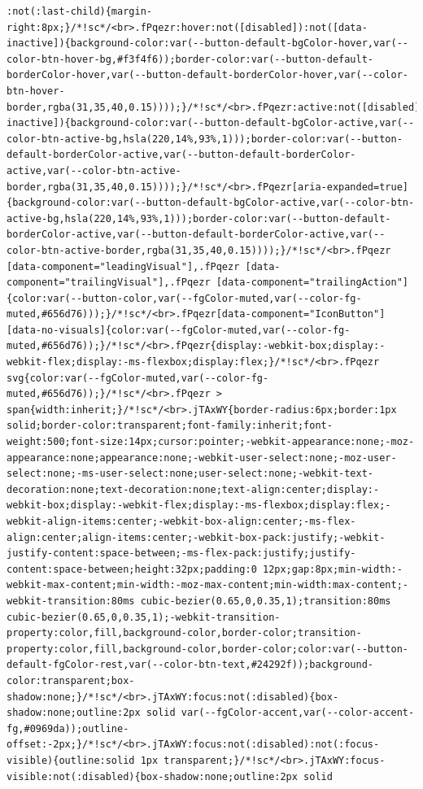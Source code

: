 \documentclass[
  letterpaper,
]{book}
\begin{document}
\begin{verbatim}
:not(:last-child){margin-right:8px;}/*!sc*/<br>.fPqezr:hover:not([disabled]):not([data-inactive]){background-color:var(--button-default-bgColor-hover,var(--color-btn-hover-bg,#f3f4f6));border-color:var(--button-default-borderColor-hover,var(--button-default-borderColor-hover,var(--color-btn-hover-border,rgba(31,35,40,0.15))));}/*!sc*/<br>.fPqezr:active:not([disabled]):not([data-inactive]){background-color:var(--button-default-bgColor-active,var(--color-btn-active-bg,hsla(220,14%,93%,1)));border-color:var(--button-default-borderColor-active,var(--button-default-borderColor-active,var(--color-btn-active-border,rgba(31,35,40,0.15))));}/*!sc*/<br>.fPqezr[aria-expanded=true]{background-color:var(--button-default-bgColor-active,var(--color-btn-active-bg,hsla(220,14%,93%,1)));border-color:var(--button-default-borderColor-active,var(--button-default-borderColor-active,var(--color-btn-active-border,rgba(31,35,40,0.15))));}/*!sc*/<br>.fPqezr [data-component="leadingVisual"],.fPqezr [data-component="trailingVisual"],.fPqezr [data-component="trailingAction"]{color:var(--button-color,var(--fgColor-muted,var(--color-fg-muted,#656d76)));}/*!sc*/<br>.fPqezr[data-component="IconButton"][data-no-visuals]{color:var(--fgColor-muted,var(--color-fg-muted,#656d76));}/*!sc*/<br>.fPqezr{display:-webkit-box;display:-webkit-flex;display:-ms-flexbox;display:flex;}/*!sc*/<br>.fPqezr svg{color:var(--fgColor-muted,var(--color-fg-muted,#656d76));}/*!sc*/<br>.fPqezr > span{width:inherit;}/*!sc*/<br>.jTAxWY{border-radius:6px;border:1px solid;border-color:transparent;font-family:inherit;font-weight:500;font-size:14px;cursor:pointer;-webkit-appearance:none;-moz-appearance:none;appearance:none;-webkit-user-select:none;-moz-user-select:none;-ms-user-select:none;user-select:none;-webkit-text-decoration:none;text-decoration:none;text-align:center;display:-webkit-box;display:-webkit-flex;display:-ms-flexbox;display:flex;-webkit-align-items:center;-webkit-box-align:center;-ms-flex-align:center;align-items:center;-webkit-box-pack:justify;-webkit-justify-content:space-between;-ms-flex-pack:justify;justify-content:space-between;height:32px;padding:0 12px;gap:8px;min-width:-webkit-max-content;min-width:-moz-max-content;min-width:max-content;-webkit-transition:80ms cubic-bezier(0.65,0,0.35,1);transition:80ms cubic-bezier(0.65,0,0.35,1);-webkit-transition-property:color,fill,background-color,border-color;transition-property:color,fill,background-color,border-color;color:var(--button-default-fgColor-rest,var(--color-btn-text,#24292f));background-color:transparent;box-shadow:none;}/*!sc*/<br>.jTAxWY:focus:not(:disabled){box-shadow:none;outline:2px solid var(--fgColor-accent,var(--color-accent-fg,#0969da));outline-offset:-2px;}/*!sc*/<br>.jTAxWY:focus:not(:disabled):not(:focus-visible){outline:solid 1px transparent;}/*!sc*/<br>.jTAxWY:focus-visible:not(:disabled){box-shadow:none;outline:2px solid 
\end{verbatim}
\end{document}
